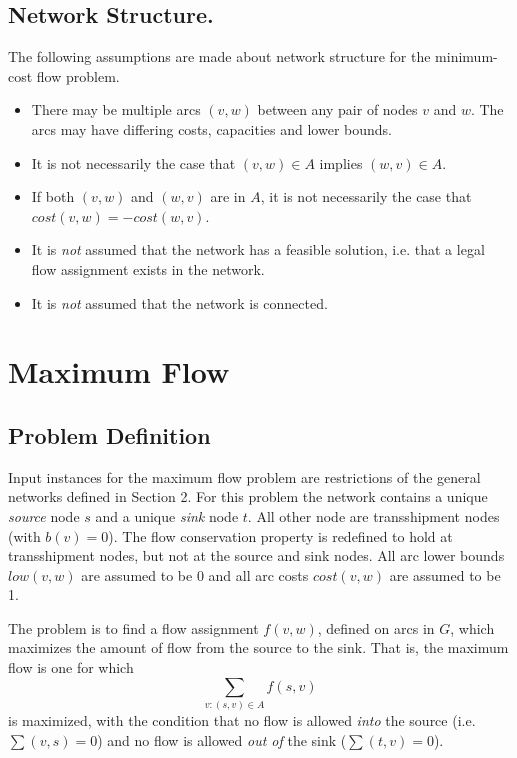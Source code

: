 \subsection{Network Structure.} 
The following assumptions are made about network structure for the
minimum-cost flow problem.
\begin{itemize}
\item There may be multiple arcs $(v,w)$ between any pair of 
nodes $v$ and $w$. The arcs may have differing costs, capacities and
lower bounds.

\item It is not necessarily the case that 
$(v,w) \in A $ implies $(w,v) \in A$.

\item If both $(v,w)$ and $(w,v)$ are in $A$, it is not 
necessarily the case that $cost(v,w) = - cost(w,v)$.

\item It is {\em not} assumed that the network has a feasible solution, i.e.
that a legal flow assignment exists in the network.

\item It is {\em not} assumed that the network is connected.  

\end{itemize}

\section{Maximum Flow} 

\subsection{Problem Definition} 

Input instances for the maximum flow problem are restrictions of the
general networks defined in Section 2.  For this problem the network
contains a unique {\em source} node $s$ and a
unique {\em sink} node  $t$.  All other node are transshipment nodes
(with $b(v) = 0$).  The flow conservation property is redefined to hold at
transshipment nodes, but not at the source and sink nodes.  All arc
lower bounds $low(v,w)$ are assumed to be 0 and all arc costs
$cost(v,w)$ are assumed to be 1.

The problem is to find a flow assignment $f(v,w)$, defined on 
arcs in $G$, which maximizes the 
amount of flow from the source to the sink.  That is, the maximum flow
is one for which 
\[
\sum_{v: (s,v) \in A} f(s,v) 
\]
is maximized, with the condition that no flow is allowed 
{\em into} the source (i.e.  $\sum (v,s) = 0$) and no flow is 
allowed {\em out of} the sink ($\sum (t,v) = 0$).  

